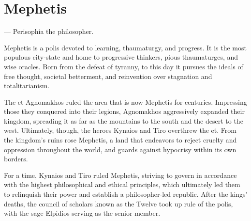 \section{Mephetis} \label{sec::mephetis}

\hspace*{\fill} --- Perisophia the philosopher.

\thispagestyle{empty} %

Mephetis is a polis devoted to learning, thaumaturgy, and progress.
It is the most populous city-state and home to progressive thinkers, pious thaumaturges, and wise oracles.
Born from the defeat of tyranny, to this day it pursues the ideals of free thought, societal betterment, and reinvention over stagnation and totalitarianism.

The et Agnomakhos ruled the area that is now Mephetis for centuries.
Impressing those they conquered into their legions, Agnomakhos aggressively expanded their kingdom, spreading it as far as the mountains to the south and the desert to the west.
Ultimately, though, the heroes Kynaios and Tiro overthrew the et.
From the kingdom's ruins rose Mephetis, a land that endeavors to reject cruelty and oppression throughout the world, and guards against hypocrisy within its own borders.

For a time, Kynaios and Tiro ruled Mephetis, striving to govern in accordance with the highest philosophical and ethical principles, which ultimately led them to relinquish their power and establish a philosopher-led republic.
After the kings' deaths, the council of scholars known as the Twelve took up rule of the polis, with the sage Elpidios serving as the senior member.

